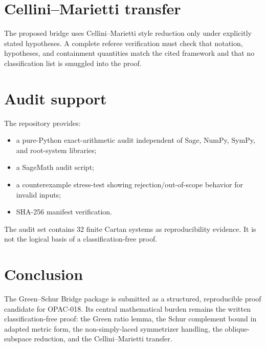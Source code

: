 \documentclass[11pt]{article}
\begin{document}
\section{Cellini--Marietti transfer}
The proposed bridge uses Cellini--Marietti style reduction only under explicitly stated hypotheses. A complete referee verification must check that notation, hypotheses, and containment quantities match the cited framework and that no classification list is smuggled into the proof.

\section{Audit support}
The repository provides:
\begin{itemize}
\item a pure-Python exact-arithmetic audit independent of Sage, NumPy, SymPy, and root-system libraries;
\item a SageMath audit script;
\item a counterexample stress-test showing rejection/out-of-scope behavior for invalid inputs;
\item SHA-256 manifest verification.
\end{itemize}
The audit set contains 32 finite Cartan systems as reproducibility evidence. It is not the logical basis of a classification-free proof.

\section{Conclusion}
The Green--Schur Bridge package is submitted as a structured, reproducible proof candidate for OPAC-018. Its central mathematical burden remains the written classification-free proof: the Green ratio lemma, the Schur complement bound in adapted metric form, the non-simply-laced symmetrizer handling, the oblique-subspace reduction, and the Cellini--Marietti transfer.
\end{document}
